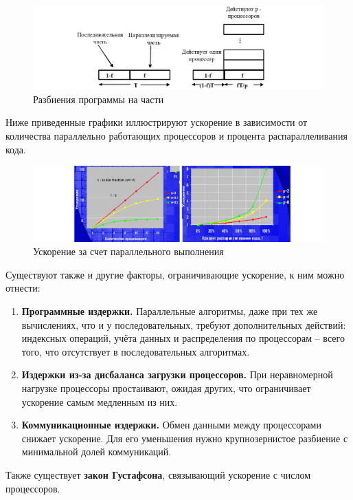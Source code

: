 	\vspace{-1.35em}
	\begin{figure}[H]
		\centering
		\includegraphics[width=1\linewidth, height=0.19\textheight]{img/02_01}
		{\small Разбиения программы на части}
		\label{fig:02_01}
	\end{figure}
	\vspace{-1em}
	Ниже приведенные графики иллюстрируют ускорение в зависимости от 
	количества параллельно работающих процессоров и процента распараллеливания кода.
	\vspace{-2em}
	\begin{figure}[H]
		\centering
		\includegraphics[width=1\linewidth, height=0.15\textheight]{img/02_02}
		{\small Ускорение за счет параллельного выполнения}
		\label{fig:02_02}
	\end{figure}
	\vspace{-1.25em}
	Существуют также и другие факторы, ограничивающие ускорение, к ним можно отнести:
	\begin{enumerate}
		\item \textbf{Программные издержки.} Параллельные алгоритмы, даже при тех же вычислениях, что и у последовательных, требуют дополнительных действий: индексных операций, учёта данных и распределения по процессорам -- всего того, что отсутствует в последовательных алгоритмах.
		\item \textbf{Издержки из-за дисбаланса загрузки процессоров.} При неравномерной нагрузке процессоры простаивают, ожидая других, что ограничивает ускорение самым медленным из них.
		\item \textbf{Коммуникационные издержки.} Обмен данными между процессорами снижает ускорение.
		\newline
		Для его уменьшения нужно крупнозернистое разбиение с минимальной долей коммуникаций.
	\end{enumerate}
	Также существует \textbf{закон Густафсона}, связывающий ускорение с числом процессоров.
	\vspace{-1em}
	
